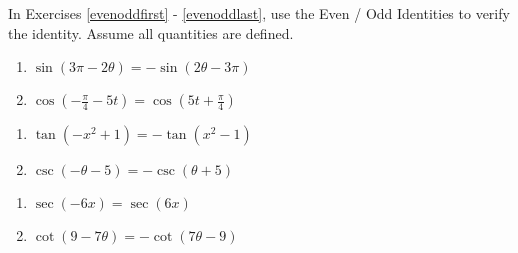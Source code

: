 \documentclass{ximera}
\begin{document}
	\author{Stitz-Zeager}


In Exercises \ref{evenoddfirst} - \ref{evenoddlast}, use the Even / Odd Identities to verify the identity.  Assume all quantities are defined.

\begin{multicols}{2}

\begin{enumerate}

\item $\sin(3\pi - 2\theta) = -\sin(2\theta - 3\pi)$  \label{evenoddfirst}
\item $\cos \left( -\frac{\pi}{4} - 5t \right) = \cos \left( 5t + \frac{\pi}{4} \right)$

\setcounter{HW}{\value{enumi}}

\end{enumerate}

\end{multicols}

\begin{multicols}{2}

\begin{enumerate}

\setcounter{enumi}{\value{HW}}

\item $\tan(-x^{2} + 1) = -\tan(x^{2} - 1)$
\item $\csc(-\theta - 5) = -\csc(\theta + 5)$

\setcounter{HW}{\value{enumi}}

\end{enumerate}

\end{multicols}

\begin{multicols}{2}

\begin{enumerate}

\setcounter{enumi}{\value{HW}}

\item $\sec(-6x) = \sec(6x)$
\item $\cot(9 - 7\theta) = -\cot(7\theta - 9)$ \label{evenoddlast}

\setcounter{HW}{\value{enumi}}

\end{enumerate}

\end{multicols}
\end{document}
